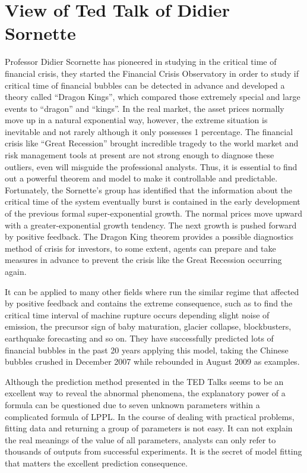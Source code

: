 \section{View of Ted Talk of Didier Sornette}
Professor Didier Scornette has pioneered in studying in the critical time of financial crisis, they started the Financial Crisis Observatory in order to study if critical time of financial bubbles can be detected in advance and developed a theory called ``Dragon Kings'', which compared those extremely special and large events to ``dragon'' and ``kings''. In the real market, the asset prices normally move up in a natural exponential way, however, the extreme situation is inevitable and not rarely although it only possesses 1 percentage. The financial crisis like ``Great Recession'' brought incredible tragedy to the world market and risk management tools at present are not strong enough to diagnose these outliers, even will misguide the professional analysts. Thus, it is essential to find out a powerful theorem and model to make it controllable and predictable.
Fortunately, the Sornette's group has identified that the information about the critical time of the system eventually burst is contained in the early development of the previous formal super-exponential growth. The normal prices move upward with a greater-exponential growth tendency. The next growth is pushed forward by positive feedback. The Dragon King theorem provides a possible diagnostics method of crisis for investors, to some extent, agents can prepare and take measures in advance to prevent the crisis like the Great Recession occurring again.

It can be applied to many other fields where run the similar regime that affected by positive feedback and contains the extreme consequence, such as to find the critical time interval of machine rupture occurs depending slight noise of emission, the precursor sign of baby maturation, glacier collapse, blockbusters, earthquake forecasting and so on. They have successfully predicted lots of financial bubbles in the past 20 years applying this model, taking the Chinese bubbles crushed in December 2007 while rebounded in August 2009 as examples.

Although the prediction method presented in the TED Talks seems to be an excellent way to reveal the abnormal phenomena, the explanatory power of a formula can be questioned due to seven unknown parameters within a complicated formula of LPPL. In the course of dealing with practical problems, fitting data and returning a group of parameters is not easy. It can not explain the real meanings of the value of all parameters, analysts can only refer to thousands of outputs from successful experiments. It is the secret of model fitting that matters the excellent prediction consequence.

